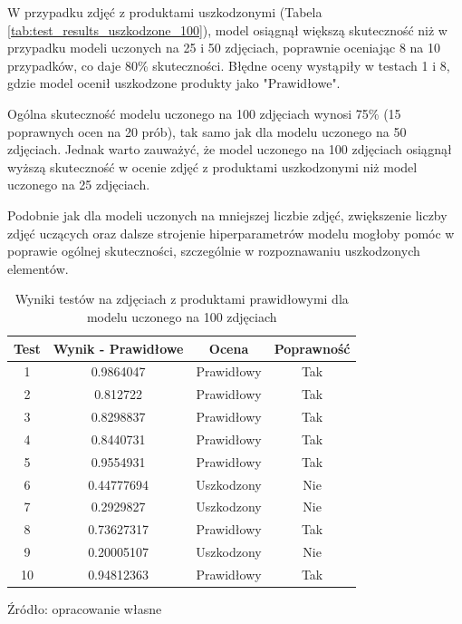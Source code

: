 W przypadku zdjęć z produktami uszkodzonymi (Tabela \ref{tab:test_results_uszkodzone_100}), model osiągnął większą skuteczność niż w przypadku modeli uczonych na 25 i 50 zdjęciach, poprawnie oceniając 8 na 10 przypadków, co daje 80\% skuteczności. Błędne oceny wystąpiły w testach 1 i 8, gdzie model ocenił uszkodzone produkty jako "Prawidłowe".

Ogólna skuteczność modelu uczonego na 100 zdjęciach wynosi 75\% (15 poprawnych ocen na 20 prób), tak samo jak dla modelu uczonego na 50 zdjęciach. Jednak warto zauważyć, że model uczonego na 100 zdjęciach osiągnął wyższą skuteczność w ocenie zdjęć z produktami uszkodzonymi niż model uczonego na 25 zdjęciach.

Podobnie jak dla modeli uczonych na mniejszej liczbie zdjęć, zwiększenie liczby zdjęć uczących oraz dalsze strojenie hiperparametrów modelu mogłoby pomóc w poprawie ogólnej skuteczności, szczególnie w rozpoznawaniu uszkodzonych elementów.

\begin{table}[H]
\centering
\caption{Wyniki testów na zdjęciach z produktami prawidłowymi dla modelu uczonego na 100 zdjęciach}
\begin{tabular}{|c|c|c|c|}
\hline
\textbf{Test} & \textbf{Wynik - Prawidłowe} & \textbf{Ocena} & \textbf{Poprawność} \\ \hline
1  & 0.9864047 & Prawidłowy & Tak \\ \hline
2  & 0.812722 & Prawidłowy & Tak \\ \hline
3  & 0.8298837 & Prawidłowy & Tak \\ \hline
4  & 0.8440731 & Prawidłowy & Tak \\ \hline
5  & 0.9554931 & Prawidłowy & Tak \\ \hline
6  & 0.44777694 & Uszkodzony & Nie \\ \hline
7  & 0.2929827 & Uszkodzony & Nie \\ \hline
8  & 0.73627317 & Prawidłowy & Tak \\ \hline
9  & 0.20005107 & Uszkodzony & Nie \\ \hline
10  & 0.94812363 & Prawidłowy & Tak \\ \hline
\end{tabular}
\begin{center}
\footnotesize{Źródło: opracowanie własne}
\end{center}
\label{tab:test_results_prawidlowe_100}
\end{table}

